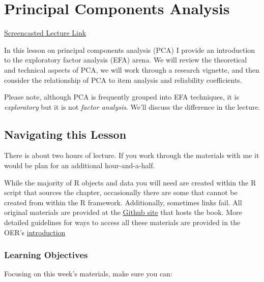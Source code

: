\documentclass[
  english,
]{book}
\begin{document}
\hypertarget{PCA}{%
\chapter{Principal Components Analysis}\label{PCA}}

\href{https://spu.hosted.panopto.com/Panopto/Pages/Viewer.aspx?pid=46cdce66-0d08-4c9c-ab41-adab000d18c4}{Screencasted Lecture Link}

In this lesson on principal components analysis (PCA) I provide an introduction to the exploratory factor analysis (EFA) arena. We will review the theoretical and technical aspects of PCA, we will work through a research vignette, and then consider the relationship of PCA to item analysis and reliability coefficients.

Please note, although PCA is frequently grouped into EFA techniques, it is \emph{exploratory} but it is not \emph{factor analysis}. We'll discuss the difference in the lecture.

\hypertarget{navigating-this-lesson-6}{%
\section{Navigating this Lesson}\label{navigating-this-lesson-6}}

There is about two hours of lecture. If you work through the materials with me it would be plan for an additional hour-and-a-half.

While the majority of R objects and data you will need are created within the R script that sources the chapter, occasionally there are some that cannot be created from within the R framework. Additionally, sometimes links fail. All original materials are provided at the \href{https://github.com/lhbikos/ReC_Psychometrics}{Github site} that hosts the book. More detailed guidelines for ways to access all these materials are provided in the OER's \protect\hyperlink{ReCintro}{introduction}

\hypertarget{learning-objectives-6}{%
\subsection{Learning Objectives}\label{learning-objectives-6}}

Focusing on this week's materials, make sure you can:
\end{document}

